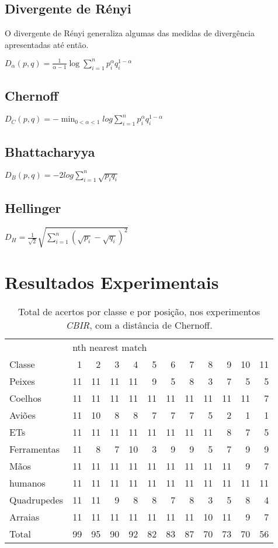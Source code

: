\subsection{Divergente de Rényi}
O divergente de Rényi generaliza algumas das medidas de divergência apresentadas até então.

$D_{\alpha}(p,q) =\frac{1}{\alpha-1}\log{\sum\limits_{i = 1}^{n}{p_i^{\alpha}q_i^{1-\alpha}}}$

\subsection{Chernoff}
$\displaystyle D_C(p,q) = - \min_{0<\alpha<1}{log{\sum\limits_{i=1}^{n}{p_i^{\alpha}q_i^{1-\alpha}}}}$

\subsection{Bhattacharyya}
$D_{B}(p,q) = -2log{\sum\limits_{i = 1}^{n}{\sqrt{p_{i}q_{i}}}}$

\subsection{Hellinger}
$D_{H}=\frac{1}{\sqrt{2}}\sqrt{\sum\limits_{i = 1}^{n}{(\sqrt{p_{i}}-\sqrt{q_{i}})^2}}$


\section{Resultados Experimentais}

\begin{table*}
\centering
\caption{\label{tab:Kimia} Total de acertos por classe e por posição, nos experimentos \emph{CBIR}, com a distância de Chernoff.}
\begin{tabular}{l| r r r r r r r r r r r}
\hline
&\multicolumn{11}{l}{nth nearest match} \\
\cline{2-12}
Classe&1&2&3&4&5&6&7&8&9&10&11 \\
 \hline
Peixes&11&11&11&11&9&5&8&3&7&5&5\\
Coelhos&11&11&11&11&11&11&11&11&11&11&7\\ 
Aviões&11&10&8&8&7&7&7&5&2&1&1\\
ETs&11&11&11&11&11&11&11&11&8&7&5\\
Ferramentas&11&8&7&10&3&9&9&5&7&9&9\\
Mãos&11&11&11&11&11&11&11&11&11&9&7\\
humanos&11&11&11&11&11&11&11&11&11&11&11\\
Quadrupedes&11&11&9&8&8&7&8&3&5&8&4\\
Arraias&11&11&11&11&11&11&11&10&11&9&7\\
\hline
Total&99&95&90&92&82&83&87&70&73&70&56\\
\hline
\end{tabular}
\end{table*}

